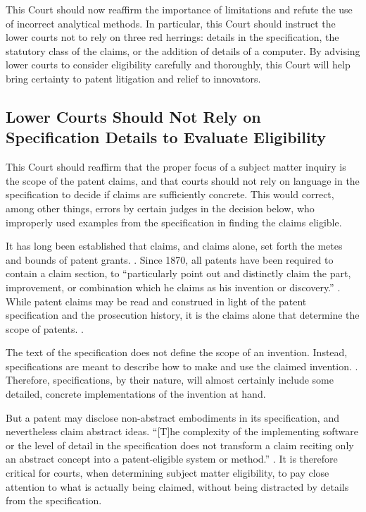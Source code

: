 \documentclass{scotus}
\begin{document}
This Court should now reaffirm the importance of  limitations and
refute the use of incorrect analytical methods. In particular, this Court should
instruct the lower courts not to rely on three red herrings: details in the
specification, the statutory class of the claims,
or the addition of details of a computer. By advising lower courts to consider
eligibility carefully and thoroughly, this Court will help bring certainty to
patent litigation and relief to innovators. 


%
%
\subsection{Lower Courts Should Not Rely on
Specification Details to Evaluate Eligibility}

This Court should reaffirm that the proper focus of a  subject
matter inquiry is the scope of the patent claims, and that courts should not
rely on language in the specification to decide if claims are sufficiently
concrete. This would correct, among other things, errors by certain judges in
the
decision below, who improperly used examples from the specification in finding
the claims eligible.

It has long been established that claims, and claims alone, set forth the metes
and bounds of patent grants. . Since 1870, all patents
have been required to contain a claim section, to ``particularly point out and
distinctly claim the part, improvement, or combination which he claims as his
invention or discovery.'' .
While patent claims may be read and construed in light of the patent
specification and the prosecution history, it is the claims alone that determine
the scope of patents. .
        
The text of the specification does not define the scope of an invention.
Instead, specifications are meant to describe how to make and use the claimed
invention. . Therefore, specifications, by their nature,
will almost certainly include some detailed, concrete implementations of the
invention at hand.

But a patent may disclose non-abstract embodiments in its specification, and
nevertheless claim abstract ideas. ``[T]he complexity of the
implementing software or the level of detail in the specification does not
transform a claim reciting only an abstract concept into a patent-eligible
system or method.'' . It is therefore
critical
for courts,
when determining subject matter eligibility, to pay close
attention to what is actually being claimed, without being distracted by details
from the specification.
\end{document}

